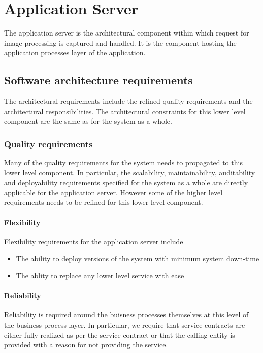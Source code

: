 \documentclass[a4paper,12pt]{report}
\begin{document}
\section {Application Server}
The application server is the architectural component within which request for image processing is captured and handled. It is the component hosting the application processes layer of the application.

\subsection {Software architecture requirements}
The architectural requirements include the refined quality requirements and the architectural responsibilities. The architectural constraints for this lower level component are the same as for the system as a whole.

\subsubsection {Quality requirements}
Many of the quality requirements for the system needs to propagated to this lower level component.
In particular, the scalability, maintainability, auditability and deployability requirements specified for the system as a whole are directly applicable for the application server. However some of the higher level requirements needs to be refined for this lower level component.

\paragraph {Flexibility} 
\hfill \break
 Flexibility requirements for the application server include
	\begin{itemize}
		\item The ability to deploy versions of the system with minimum system down-time
		\item The ablity to replace any lower level service with ease
	\end{itemize}
\paragraph {Reliability}
\hfill \break
	Reliability is required around the buisness processes themselves at this level of the business process layer.
	In particular, we require that service contracts are either fully realized as per the service contract or that the calling entity is provided with a reason  for not providing the service.
\end{document}
